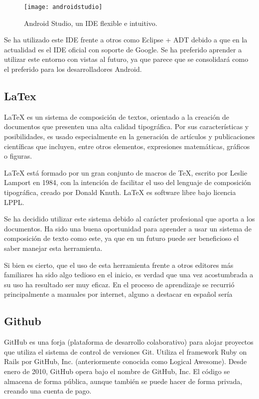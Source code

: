 \begin{figure}[h]
	\centering
	\texttt{[image: androidstudio]}
	\caption{Android Studio, un IDE flexible e intuitivo.}
	\label{fig:androidstudio}
\end{figure}

Se ha utilizado este IDE frente a otros como Eclipse + ADT \cite{URL::eclipseADT} debido a que en la actualidad es el IDE oficial con soporte de Google. Se ha preferido aprender a utilizar este entorno con vistas al futuro, ya que parece que se consolidará como el preferido para los desarrolladores Android.

\subsection{LaTex}

LaTeX es un sistema de composición de textos, orientado a la creación de documentos que presenten una alta calidad tipográfica. Por sus características y posibilidades, es usado especialmente en la generación de artículos y publicaciones científicas que incluyen, entre otros elementos, expresiones matemáticas, gráficos o figuras.


LaTeX está formado por un gran conjunto de macros de TeX, escrito por Leslie Lamport en 1984, con la intención de facilitar el uso del lenguaje de composición tipográfica, creado por Donald Knuth. LaTeX es software libre bajo licencia LPPL.


Se ha decidido utilizar este sistema debido al carácter profesional que aporta a los documentos. Ha sido una buena oportunidad para aprender a usar un sistema de composición de texto como este, ya que en un futuro puede ser beneficioso el saber manejar esta herramienta. 

Si bien es cierto, que el uso de esta herramienta frente a otros editores más familiares ha sido algo tedioso en el inicio, es verdad que una vez acostumbrada a su uso ha resultado ser muy eficaz. En el proceso de aprendizaje se recurrió principalmente a manuales por internet, alguno a destacar en español sería \cite{URL::manualLatex}

\subsection{Github}

GitHub\cite{URL::Github} es una forja (plataforma de desarrollo colaborativo) para alojar proyectos que utiliza el sistema de control de versiones Git. Utiliza el framework Ruby on Rails por GitHub, Inc. (anteriormente conocida como Logical Awesome). Desde enero de 2010, GitHub opera bajo el nombre de GitHub, Inc. El código se almacena de forma pública, aunque también se puede hacer de forma privada, creando una cuenta de pago.



